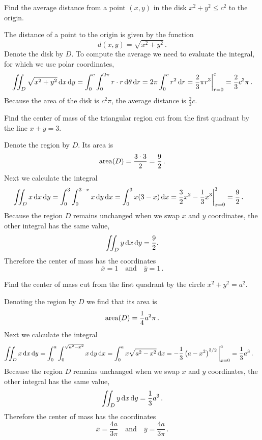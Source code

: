 \begin{question}
Find the average distance from a point $(x,y)$ in the disk $x^2 + y^2 \leq c^2$ to the origin.
\end{question}

\begin{solution}
The distance of a point to the origin is given by the function
\[
d(x,y) = \sqrt{x^2 + y^2}\,.
\]
Denote the disk by $D$. To compute the average we need to evaluate the integral, for which we use polar coordinates,
\begin{align*}
\iint_D \sqrt{x^2 + y^2} \,\mathrm{d} x \,\mathrm{d} y
= \int_0^c \int_0^{2\pi} r \cdot r \,\mathrm{d} \theta \,\mathrm{d} r
= 2\pi \int_0^c r^2 \,\mathrm{d} r
= \frac 23 \pi r^3 \bigg|_{r=0}^c
= \frac 23 c^3 \pi\,.
\end{align*}
Because the area of the disk is $c^2\pi$, the average distance is $\frac 23 c$.
\end{solution}

\begin{question}
Find the center of mass of the triangular region cut from the first quadrant by the line $x+y=3$.
\end{question}

\begin{solution}
Denote the region by $D$. Its area is
\[
\operatorname{area}(D) = \frac {3\cdot 3}{2} = \frac 92\,.
\]
Next we calculate the integral
\begin{align*}
\iint_D x \,\mathrm{d} x \,\mathrm{d} y 
&= \int_0^3 \int_0^{3-x} x \,\mathrm{d} y \,\mathrm{d} x
= \int_0^3 x(3-x) \,\mathrm{d} x = \frac 32 x^2 - \frac 13 x^3 \bigg|_{x=0}^3
= \frac 92\,.
\end{align*}
Because the region $D$ remains unchanged when we swap $x$ and $y$ coordinates, the other integral has the same value,
\[
\iint_D y \,\mathrm{d} x \,\mathrm{d} y = \frac 92.
\]
Therefore the center of mass has the coordinates
\[
\bar x = 1
\quad\text{and}\quad
\bar y = 1\,.
\]
\end{solution}

\begin{question}
Find the center of mass cut from the first quadrant by the circle $x^2 + y^2 = a^2$.
\end{question}

\begin{solution}
Denoting the region by $D$ we find that its area is
\[
\operatorname{area} (D) = \frac 14 a^2 \pi\,.
\]
Next we calculate the integral
\begin{align*}
\iint_D x \,\mathrm{d} x \,\mathrm{d} y
&= \int_0^a \int_0^{\sqrt{a^2-x^2}} x \,\mathrm{d} y \,\mathrm{d} x
= \int_0^a x \sqrt{a^2-x^2} \,\mathrm{d} x
= -\frac 13 \left(a-x^2\right)^{3/2} \bigg|_{x=0}^a
= \frac 13 a^3\,.
\end{align*}
Because the region $D$ remains unchanged when we swap $x$ and $y$ coordinates, the other integral has the same value,
\begin{align*}
\iint_D y \,\mathrm{d} x \,\mathrm{d} y = \frac 13 a^3\,.
\end{align*}
Therefore the center of mass has the coordinates
\[
\bar x = \frac {4a}{3\pi}
\quad\text{and}\quad
\bar y = \frac {4a}{3\pi}\,.
\]
\end{solution}

